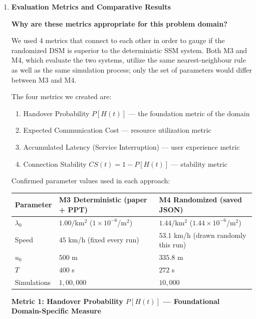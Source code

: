\documentclass[11pt]{article}
\newcommand{\subquestion}[1]{
    \vspace{0.3cm}
    \noindent\textbf{#1}
    \vspace{0.1cm}
}
\begin{document}
\begin{enumerate}[label=\textbf{Scribe Question \arabic*:}, leftmargin=*, itemsep=1.5em]
\newpage
\item \textbf{Evaluation Metrics and Comparative Results}

\subquestion{Why are these metrics appropriate for this problem domain?}

We used 4 metrics that connect to each other in order to gauge if the randomized DSM is superior to
the deterministic SSM system. Both M3 and M4, which evaluate the two systems, utilize the same
nearest-neighbour rule as well as the same simulation process; only the set of parameters would
differ between M3 and M4.

The four metrics we created are:
\begin{enumerate}[leftmargin=*, itemsep=0.2em]
    \item Handover Probability $P[H(t)]$ --- the foundation metric of the domain
    \item Expected Communication Cost --- resource utilization metric
    \item Accumulated Latency (Service Interruption) --- user experience metric
    \item Connection Stability $CS(t) = 1 - P[H(t)]$ --- stability metric
\end{enumerate}

Confirmed parameter values used in each approach:

\vspace{0.3cm}
\begin{center}
\begin{tabular}{lll}
    \toprule
    \textbf{Parameter} & \textbf{M3 Deterministic (paper + PPT)} & \textbf{M4 Randomized (saved JSON)} \\
    \midrule
    $\lambda_0$ & $1.00$/km$^2$ ($1\times10^{-6}$/m$^2$) & $1.44$/km$^2$ ($1.44\times10^{-6}$/m$^2$) \\
    Speed       & $45$ km/h (fixed every run) & $53.1$ km/h (drawn randomly this run) \\
    $u_0$       & $500$ m & $335.8$ m \\
    $T$         & $400$ s & $272$ s \\
    Simulations & $1{,}00{,}000$ & $10{,}000$ \\
    \bottomrule
\end{tabular}
\end{center}
\vspace{0.3cm}

\subquestion{Metric 1: Handover Probability $P[H(t)]$ --- Foundational Domain-Specific Measure}


\end{enumerate}
\end{document}
